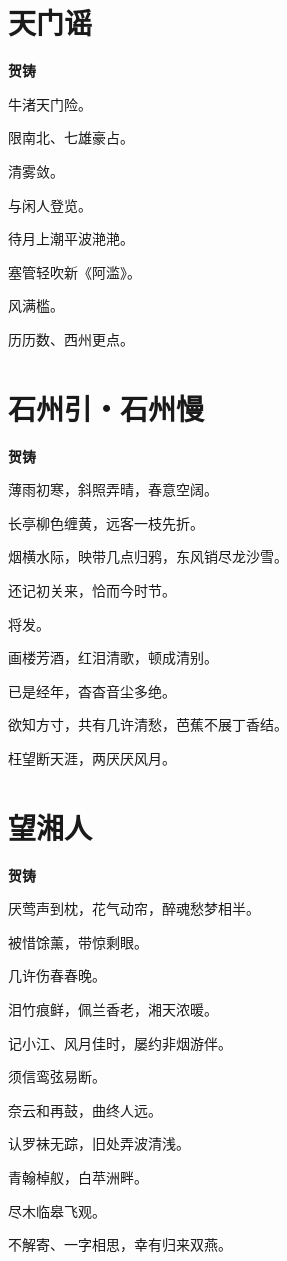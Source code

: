\documentclass[12pt,a4paper]{ctexbook}
\begin{document}
\section{天门谣}
\textbf{贺铸}\par\vspace{0.5em}
牛渚天门险。\par
限南北、七雄豪占。\par
清雾敛。\par
与闲人登览。\par
待月上潮平波滟滟。\par
塞管轻吹新《阿滥》。\par
风满槛。\par
历历数、西州更点。\par

\section{石州引・石州慢}
\textbf{贺铸}\par\vspace{0.5em}
薄雨初寒，斜照弄晴，春意空阔。\par
长亭柳色缠黄，远客一枝先折。\par
烟横水际，映带几点归鸦，东风销尽龙沙雪。\par
还记初关来，恰而今时节。\par
将发。\par
画楼芳酒，红泪清歌，顿成清别。\par
已是经年，杳杳音尘多绝。\par
欲知方寸，共有几许清愁，芭蕉不展丁香结。\par
枉望断天涯，两厌厌风月。\par

\section{望湘人}
\textbf{贺铸}\par\vspace{0.5em}
厌莺声到枕，花气动帘，醉魂愁梦相半。\par
被惜馀薰，带惊剩眼。\par
几许伤春春晚。\par
泪竹痕鲜，佩兰香老，湘天浓暖。\par
记小江、风月佳时，屡约非烟游伴。\par
须信鸾弦易断。\par
奈云和再鼓，曲终人远。\par
认罗袜无踪，旧处弄波清浅。\par
青翰棹舣，白苹洲畔。\par
尽木临皋飞观。\par
不解寄、一字相思，幸有归来双燕。\par
\end{document}
